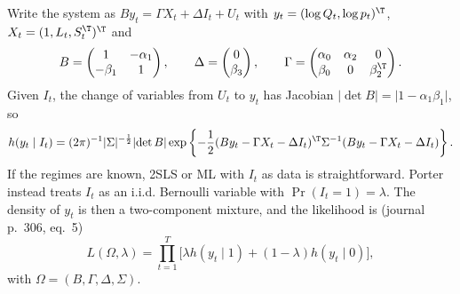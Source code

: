 Write the system as $By_t = \Gamma X_t + \Delta I_t + U_t$ with $y_t = (\log Q_t, \log p_t)^\T$, $X_t = (1, L_t, S_t^\T)^\T$ and
\begin{equation*}
  B = \begin{pmatrix} 1 & -\alpha_1 \\ -\beta_1 & 1\end{pmatrix}, \qquad
  \Delta = \begin{pmatrix} 0 \\ \beta_3\end{pmatrix}, \qquad
  \Gamma = \begin{pmatrix} \alpha_0 & \alpha_2 & 0 \\ \beta_0 & 0 & \beta_2^\T\end{pmatrix}.
\end{equation*}
Given $I_t$, the change of variables from $U_t$ to $y_t$ has Jacobian $\lvert\det B\rvert = \lvert 1 - \alpha_1\beta_1\rvert$, so
\begin{equation}\label{eq:A-porter-h}
  h(y_t \mid I_t) = (2\pi)^{-1}\lvert\Sigma\rvert^{-\frac{1}{2}}\lvert\det B\rvert
  \exp\left\{-\frac{1}{2}(By_t - \Gamma X_t - \Delta I_t)^\T\Sigma^{-1}(By_t - \Gamma X_t - \Delta I_t)\right\}.
\end{equation}
If the regimes are known, 2SLS or ML with $I_t$ as data is straightforward. Porter instead treats $I_t$ as an i.i.d.
Bernoulli variable with $\Pr(I_t = 1) = \lambda$. The density of $y_t$ is then a two-component mixture, and the likelihood is
(journal p.~306, eq.~5)
\begin{equation}\label{eq:A-mixture}
  L(\Omega, \lambda) = \prod_{t=1}^T\big[\lambda h(y_t \mid 1) + (1 - \lambda)h(y_t \mid 0)\big],
\end{equation}
with $\Omega = (B, \Gamma, \Delta, \Sigma)$.

